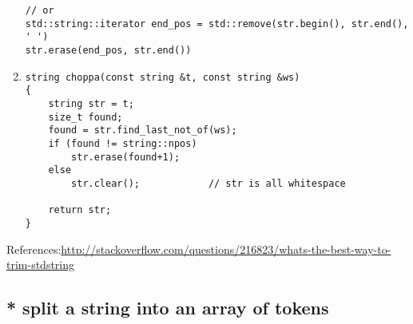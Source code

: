 \begin{enumerate}
\begin{verbatim}
// or
std::string::iterator end_pos = std::remove(str.begin(), str.end(), ' ')
str.erase(end_pos, str.end())
\end{verbatim}
  
  \item 
\begin{verbatim}
string choppa(const string &t, const string &ws)
{
    string str = t;
    size_t found;
    found = str.find_last_not_of(ws);
    if (found != string::npos)
    	str.erase(found+1);
    else
    	str.clear();            // str is all whitespace

    return str;
}
\end{verbatim}
\end{enumerate}
References:\url{http://stackoverflow.com/questions/216823/whats-the-best-way-to-trim-stdstring}

\subsection{* split a string into an array of tokens}


